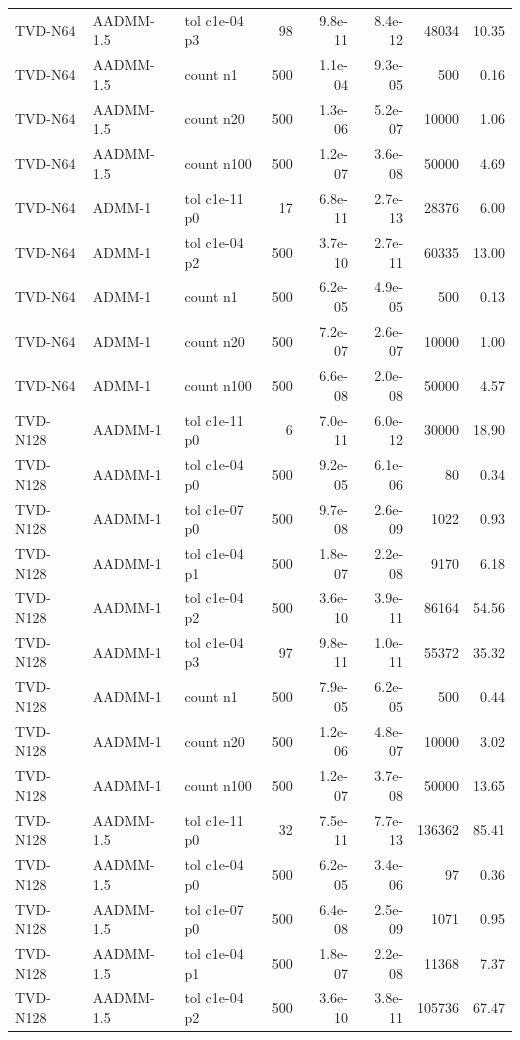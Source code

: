 \begin{tabular}{lllrrrrr}
TVD-N64 & AADMM-1.5 & tol c1e-04 p3 & 98 & 9.8e-11 & 8.4e-12 & 48034 & 10.35\\
TVD-N64 & AADMM-1.5 & count n1 & 500 & 1.1e-04 & 9.3e-05 & 500 & 0.16\\
TVD-N64 & AADMM-1.5 & count n20 & 500 & 1.3e-06 & 5.2e-07 & 10000 & 1.06\\
TVD-N64 & AADMM-1.5 & count n100 & 500 & 1.2e-07 & 3.6e-08 & 50000 & 4.69\\
TVD-N64 & ADMM-1 & tol c1e-11 p0 & 17 & 6.8e-11 & 2.7e-13 & 28376 & 6.00\\
TVD-N64 & ADMM-1 & tol c1e-04 p2 & 500 & 3.7e-10 & 2.7e-11 & 60335 & 13.00\\
TVD-N64 & ADMM-1 & count n1 & 500 & 6.2e-05 & 4.9e-05 & 500 & 0.13\\
TVD-N64 & ADMM-1 & count n20 & 500 & 7.2e-07 & 2.6e-07 & 10000 & 1.00\\
TVD-N64 & ADMM-1 & count n100 & 500 & 6.6e-08 & 2.0e-08 & 50000 & 4.57\\
TVD-N128 & AADMM-1 & tol c1e-11 p0 & 6 & 7.0e-11 & 6.0e-12 & 30000 & 18.90\\
TVD-N128 & AADMM-1 & tol c1e-04 p0 & 500 & 9.2e-05 & 6.1e-06 & 80 & 0.34\\
TVD-N128 & AADMM-1 & tol c1e-07 p0 & 500 & 9.7e-08 & 2.6e-09 & 1022 & 0.93\\
TVD-N128 & AADMM-1 & tol c1e-04 p1 & 500 & 1.8e-07 & 2.2e-08 & 9170 & 6.18\\
TVD-N128 & AADMM-1 & tol c1e-04 p2 & 500 & 3.6e-10 & 3.9e-11 & 86164 & 54.56\\
TVD-N128 & AADMM-1 & tol c1e-04 p3 & 97 & 9.8e-11 & 1.0e-11 & 55372 & 35.32\\
TVD-N128 & AADMM-1 & count n1 & 500 & 7.9e-05 & 6.2e-05 & 500 & 0.44\\
TVD-N128 & AADMM-1 & count n20 & 500 & 1.2e-06 & 4.8e-07 & 10000 & 3.02\\
TVD-N128 & AADMM-1 & count n100 & 500 & 1.2e-07 & 3.7e-08 & 50000 & 13.65\\
TVD-N128 & AADMM-1.5 & tol c1e-11 p0 & 32 & 7.5e-11 & 7.7e-13 & 136362 & 85.41\\
TVD-N128 & AADMM-1.5 & tol c1e-04 p0 & 500 & 6.2e-05 & 3.4e-06 & 97 & 0.36\\
TVD-N128 & AADMM-1.5 & tol c1e-07 p0 & 500 & 6.4e-08 & 2.5e-09 & 1071 & 0.95\\
TVD-N128 & AADMM-1.5 & tol c1e-04 p1 & 500 & 1.8e-07 & 2.2e-08 & 11368 & 7.37\\
TVD-N128 & AADMM-1.5 & tol c1e-04 p2 & 500 & 3.6e-10 & 3.8e-11 & 105736 & 67.47\\

\end{tabular}
